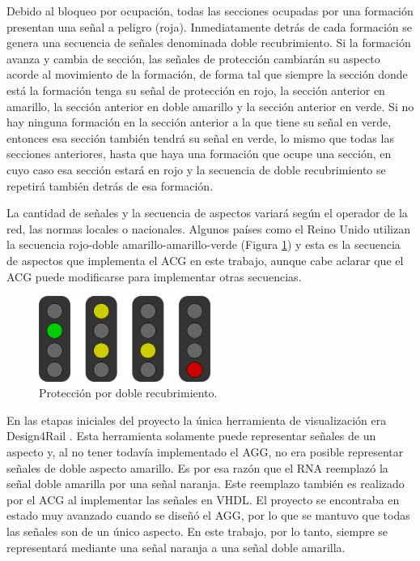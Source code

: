 	Debido al bloqueo por ocupación, todas las secciones ocupadas por una formación presentan una señal a peligro (roja). Inmediatamente detrás de cada formación se genera una secuencia de señales denominada doble recubrimiento. Si la formación avanza y cambia de sección, las señales de protección cambiarán su aspecto acorde al movimiento de la formación, de forma tal que siempre la sección donde está la formación tenga su señal de protección en rojo, la sección anterior en amarillo, la sección anterior en doble amarillo y la sección anterior en verde. Si no hay ninguna formación en la sección anterior a la que tiene su señal en verde, entonces esa sección también tendrá su señal en verde, lo mismo que todas las secciones anteriores, hasta que haya una formación que ocupe una sección, en cuyo caso esa sección estará en rojo y la secuencia de doble recubrimiento se repetirá también detrás de esa formación.
	 
	La cantidad de señales y la secuencia de aspectos variará según el operador de la red, las normas locales o nacionales. Algunos países como el Reino Unido \cite{UK} utilizan la secuencia rojo-doble amarillo-amarillo-verde (Figura \ref{fig:uk_signalling}) y esta es la secuencia de aspectos que implementa el ACG en este trabajo, aunque cabe aclarar que el ACG puede modificarse para implementar otras secuencias. 
	
	\begin{figure}[!h]
		\centering
		\includegraphics[width=0.5\textwidth]{Figuras/semaforo2}
		\centering\caption{Protección por doble recubrimiento.}
		\label{fig:uk_signalling}
	\end{figure}
	
	En las etapas iniciales del proyecto la única herramienta de visualización era Design4Rail \cite{DESIGN4RAIL}. Esta herramienta solamente puede representar señales de un aspecto y, al no tener todavía implementado el AGG, no era posible representar señales de doble aspecto amarillo. Es por esa razón que el RNA reemplazó la señal doble amarilla por una señal naranja. Este reemplazo también es realizado por el ACG al implementar las señales en VHDL. El proyecto se encontraba en estado muy avanzado cuando se diseñó el AGG, por lo que se mantuvo que todas las señales son de un único aspecto. En este trabajo, por lo tanto, siempre se representará mediante una señal naranja a una señal doble amarilla.
	
	

	
	